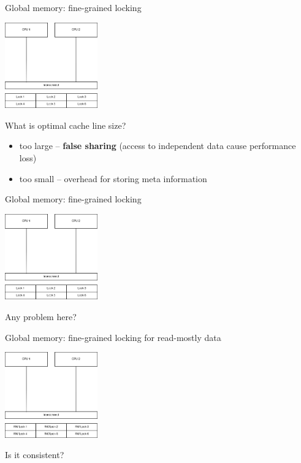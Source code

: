 \begin{frame}[t, noframenumbering]{Global memory: fine-grained locking}

\begin{center}
  \includegraphics[width=0.3\textwidth]{./pics/processor/4.png}
\end{center}


What is optimal cache line size?

\pause
\begin{itemize}
    \item too large -- \textbf{false sharing} (access to independent data cause performance loss)
    \item too small -- overhead for storing meta information
\end{itemize}    

\end{frame}


\begin{frame}[t, noframenumbering]{Global memory: fine-grained locking}

\begin{center}
  \includegraphics[width=0.3\textwidth]{./pics/processor/4.png}
\end{center}

Any problem here?

\end{frame}


\begin{frame}{Global memory: fine-grained locking for read-mostly data}

\begin{center}
  \includegraphics[width=0.3\textwidth]{./pics/processor/5.png}
\end{center}

\pause

Is it consistent?

\end{frame}

